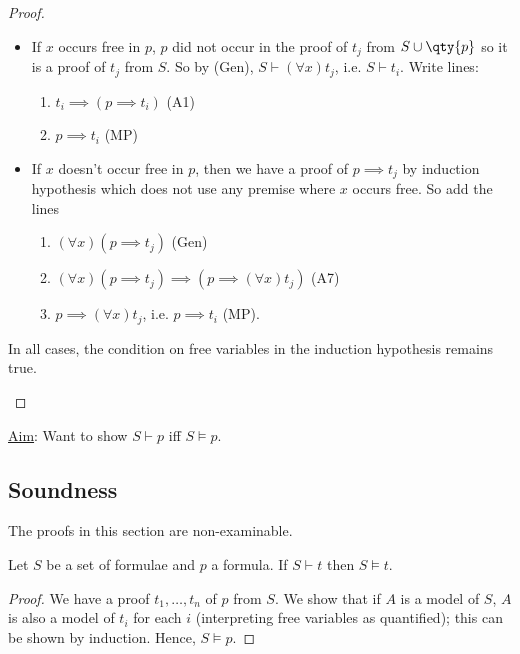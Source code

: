 \begin{proof}
\begin{itemize}
\begin{itemize}
            \item If $x$ occurs free in $p$, $p$ did not occur in the proof of $t_j$ from $S \cup \qty{p}$ so it is a proof of $t_j$ from $S$.
            So by (Gen), $S \vdash (\forall x) t_j$, i.e. $S \vdash t_i$.
            Write lines:
            \begin{enumerate}
                \item $t_i \implies (p \implies t_i)$ (A1)
                \item $p \implies t_i$ (MP)
            \end{enumerate}
            \item If $x$ doesn't occur free in $p$, then we have a proof of $p \implies t_j$ by induction hypothesis which does not use any premise where $x$ occurs free.
            So add the lines
            \begin{enumerate}
                \item $(\forall x) (p \implies t_j)$ (Gen)
                \item $(\forall x) (p \implies t_j) \implies (p \implies (\forall x) t_j)$ (A7)
                \item $p \implies (\forall x) t_j$, i.e. $p \implies t_i$ (MP).
            \end{enumerate}
        \end{itemize}

        In all cases, the condition on free variables in the induction hypothesis remains true.
    \end{itemize}
\end{proof}

\underline{Aim}: Want to show $S \vdash p$ iff $S \models p$.

\subsection{Soundness}
The proofs in this section are non-examinable.

\begin{proposition}
    Let $S$ be a set of formulae and $p$ a formula.
    If $S \vdash t$ then $S \models t$.
\end{proposition}

\begin{proof}
    We have a proof $t_1, \dots, t_n$ of $p$ from $S$.
    We show that if $A$ is a model of $S$, $A$ is also a model of $t_i$ for each $i$ (interpreting free variables as quantified); this can be shown by induction.
    Hence, $S \models p$.
\end{proof}

